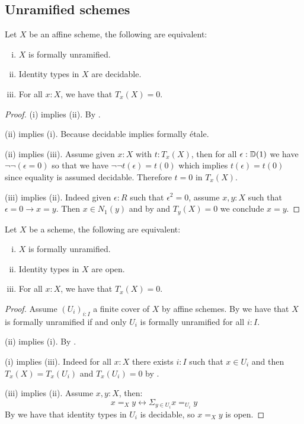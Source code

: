 

\subsection{Unramified schemes}

\begin{lemma}\label{unramified-affine-characterisation}
Let $X$ be an affine scheme, the following are equivalent:
\begin{enumerate}[(i)]
\item $X$ is formally unramified.
\item Identity types in $X$ are decidable.
\item For all $x:X$, we have that $T_x(X)=0$.
\end{enumerate}
\end{lemma}

\begin{proof}
(i) implies (ii). By .

(ii) implies (i). Because decidable implies formally étale.

(ii) implies (iii). Assume given $x:X$ with $t:T_x(X)$, then for all $\epsilon:\mathbb{D}(1)$ we have $\neg\neg(\epsilon = 0)$ so that we have $\neg\neg t(\epsilon) = t(0)$ which implies $t(\epsilon) = t(0)$ since equality is assumed decidable. Therefore $t = 0$ in $T_x(X)$.

(iii) implies (ii). Indeed given $\epsilon:R$ such that $\epsilon^2=0$, assume $x,y:X$ such that $\epsilon=0 \to x=y$. Then $x\in N_1(y)$ and by  and $T_y(X)=0$ we conclude $x=y$.
\end{proof}

\begin{corollary}\label{unramified-scheme-characterisation}
Let $X$ be a scheme, the following are equivalent:
\begin{enumerate}[(i)]
\item $X$ is formally unramified.
\item Identity types in $X$ are open.
\item For all $x:X$, we have that $T_x(X)=0$.
\end{enumerate}
\end{corollary}

\begin{proof}
Assume $(U_i)_{i:I}$ a finite cover of $X$ by affine schemes. By  we have that $X$ is formally unramified if and only $U_i$ is formally unramified for all $i:I$.

(ii) implies (i). By .

(i) implies (iii). Indeed for all $x:X$ there exists $i:I$ such that $x\in U_i$ and then $T_x(X) = T_x(U_i)$ and $T_x(U_i) = 0$ by .

(iii) implies (ii). Assume $x,y:X$, then:
\[x=_Xy \leftrightarrow \Sigma_{y\in U_i} x=_{U_i} y\]
By  we have that identity types in $U_i$ is decidable, so $x=_Xy$ is open.
\end{proof}

